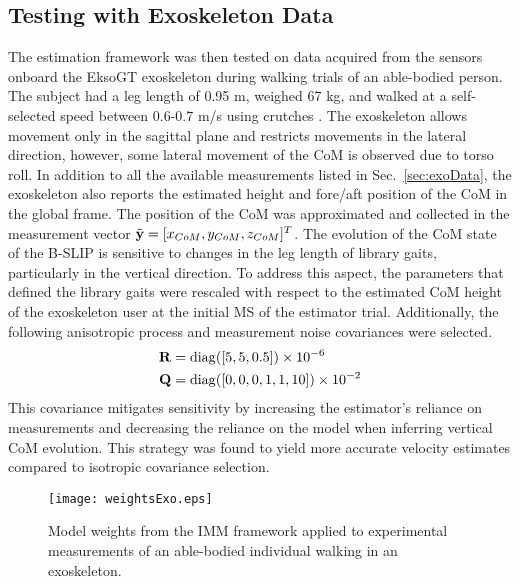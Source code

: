 \subsection{Testing with Exoskeleton Data}

The estimation framework was then tested on data acquired from the sensors onboard the EksoGT exoskeleton during walking trials of an able-bodied person. The subject had a leg length of 0.95 m, weighed 67 kg, and walked at a self-selected speed between 0.6-0.7 m/s using crutches \cite{gambon2019characterizing}. The exoskeleton allows movement only in the sagittal plane and restricts movements in the lateral direction, however, some lateral movement of the CoM is observed due to torso roll. In addition to all the available measurements listed in Sec.~\ref{sec:exoData}, the exoskeleton also reports the estimated height and fore/aft position of the CoM in the global frame. The position of the CoM was approximated and collected in the measurement vector $ \tilde{\mathbf{y}} = [x_{CoM} ,y_{CoM} ,z_{CoM}]^T $. The evolution of the CoM state of the B-SLIP is sensitive to changes in the leg length of library gaits, particularly in the vertical direction. To address this aspect, the parameters that defined the library gaits were rescaled with respect to the estimated CoM height of the exoskeleton user at the initial MS of the estimator trial. Additionally, the following anisotropic process and measurement noise covariances were selected.
\begin{align}
		\mathbf{R} &= {\rm diag}([5,5,0.5])\times 10^{-6} \\
		\mathbf{Q} &={\rm diag}([0,0,0,1,1,10])\times 10^{-2}
\end{align}
This covariance mitigates sensitivity by increasing the estimator's reliance on measurements and decreasing the reliance on the model when inferring vertical CoM evolution. This strategy was found to yield more accurate velocity estimates compared to isotropic covariance selection. 

\begin{figure}
	\centering
	\texttt{[image: weightsExo.eps]}
	\caption{Model weights from the IMM framework applied to experimental measurements of an able-bodied individual walking in an exoskeleton.}\label{fig:exoWeights}
\end{figure}

